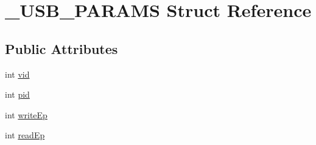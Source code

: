 \hypertarget{struct__USB__PARAMS}{\section{\-\_\-\-U\-S\-B\-\_\-\-P\-A\-R\-A\-M\-S Struct Reference}
\label{struct__USB__PARAMS}
}
\subsection*{Public Attributes}
\begin{DoxyCompactItemize}
\item 
int \hyperlink{struct__USB__PARAMS_af331972c7a1ef36ad4abeb533ea7642e}{vid}
\item 
int \hyperlink{struct__USB__PARAMS_abd24ffdfcb179d8c5a17d0f06e7d41ba}{pid}
\item 
int \hyperlink{struct__USB__PARAMS_aad4fdc18f2b5d8f76fd85e0c9b38150e}{write\-Ep}
\item 
int \hyperlink{struct__USB__PARAMS_af7d02802b70f5545b083c2bff2ec4944}{read\-Ep}
\end{DoxyCompactItemize}


